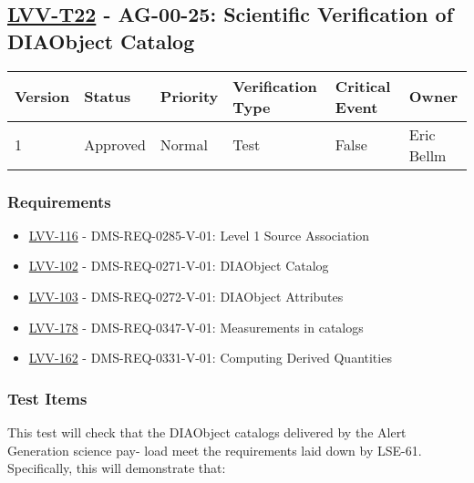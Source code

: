 \subsection{\href{https://jira.lsstcorp.org/secure/Tests.jspa\#/testCase/LVV-T22}{LVV-T22}
    - AG-00-25: Scientific Verification of DIAObject Catalog}\label{lvv-t22}

\begin{longtable}[]{llllll}
\toprule
Version & Status & Priority & Verification Type & Critical Event & Owner
\\\midrule
1 & Approved & Normal &
Test & False & Eric Bellm
\\\bottomrule
\end{longtable}

\subsubsection{Requirements}
\begin{itemize}
\item \href{https://jira.lsstcorp.org/browse/LVV-116}{LVV-116} - DMS-REQ-0285-V-01: Level 1 Source Association
\item \href{https://jira.lsstcorp.org/browse/LVV-102}{LVV-102} - DMS-REQ-0271-V-01: DIAObject Catalog
\item \href{https://jira.lsstcorp.org/browse/LVV-103}{LVV-103} - DMS-REQ-0272-V-01: DIAObject Attributes
\item \href{https://jira.lsstcorp.org/browse/LVV-178}{LVV-178} - DMS-REQ-0347-V-01: Measurements in catalogs
\item \href{https://jira.lsstcorp.org/browse/LVV-162}{LVV-162} - DMS-REQ-0331-V-01: Computing Derived Quantities
\end{itemize}

\subsubsection{Test Items}
This test will check that the DIAObject catalogs delivered by the Alert
Generation science pay- load meet the requirements laid down by
LSE-61.\\
Specifically, this will demonstrate that:

